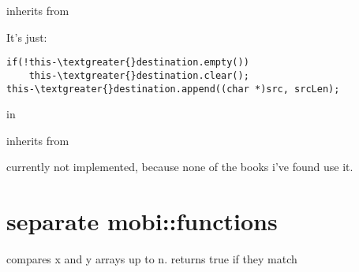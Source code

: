 \documentclass[letterpaper,10pt,english]{sphinxmanual}
\begin{document}
\begin{fulllineitems}
\label{compression:mobi::no_compression}
inherits from {\hyperref[compression:mobi::compression]{}}

It's just:

\begin{Verbatim}[commandchars=\\\{\}]
if(!this-\textgreater{}destination.empty())
    this-\textgreater{}destination.clear();
this-\textgreater{}destination.append((char *)src, srcLen);
\end{Verbatim}

in {\hyperref[compression:compression::uncompress__uint8_tP.s]{}}

\end{fulllineitems}


\begin{fulllineitems}
\label{compression:mobi::hd_compression}
inherits from {\hyperref[compression:mobi::compression]{}}

currently not implemented, because none of the books i've found use it.

\end{fulllineitems}



\section{separate mobi::functions}
\label{functions::doc}\label{functions:separate-mobi-functions}

\begin{fulllineitems}
\label{functions:mobi::strcmp_is_a_worthless_pos__cP.cP.iP}
compares x and y arrays up to n.
returns true if they match

\end{fulllineitems}


\begin{fulllineitems}
\label{functions:bswap__uint16_tR}
\end{fulllineitems}
\end{document}
